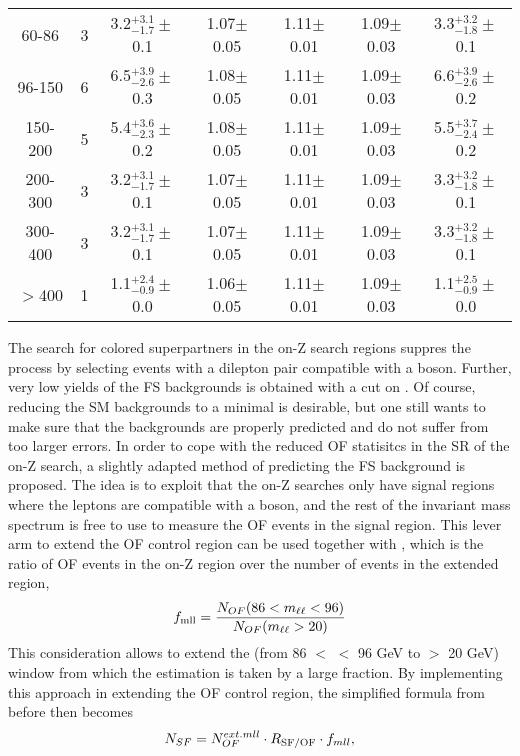 \begin{table}[ht!]
\begin{tabular}{ c  c  c  c  c  c c}
60-86    & 3    & 3.2$^{+3.1}_{-1.7}\pm$0.1  &  1.07$\pm$0.05 & 1.11$\pm$0.01& 1.09$\pm$0.03 & 3.3$^{+3.2}_{-1.8}\pm$0.1 \\
96-150   & 6    & 6.5$^{+3.9}_{-2.6}\pm$0.3  &  1.08$\pm$0.05 & 1.11$\pm$0.01& 1.09$\pm$0.03 & 6.6$^{+3.9}_{-2.6}\pm$0.2 \\
150-200  & 5    & 5.4$^{+3.6}_{-2.3}\pm$0.2  &  1.08$\pm$0.05 & 1.11$\pm$0.01& 1.09$\pm$0.03 & 5.5$^{+3.7}_{-2.4}\pm$0.2 \\
200-300  & 3    & 3.2$^{+3.1}_{-1.7}\pm$0.1  &  1.07$\pm$0.05 & 1.11$\pm$0.01& 1.09$\pm$0.03 & 3.3$^{+3.2}_{-1.8}\pm$0.1 \\
300-400  & 3    & 3.2$^{+3.1}_{-1.7}\pm$0.1  &  1.07$\pm$0.05 & 1.11$\pm$0.01& 1.09$\pm$0.03 & 3.3$^{+3.2}_{-1.8}\pm$0.1 \\
$>$400   & 1    & 1.1$^{+2.4}_{-0.9}\pm$0.0  &  1.06$\pm$0.05 & 1.11$\pm$0.01& 1.09$\pm$0.03 & 1.1$^{+2.5}_{-0.9}\pm$0.0 \\
\hline\hline
\end{tabular}
\end{table}
\newpara
\noindent\justify
The search for colored superpartners in the on-Z search regions suppres the \ttbar process by selecting events with a dilepton pair compatible with a \PZ boson.
Further, very low yields of the FS backgrounds is obtained with a cut on \mttwo.
Of course, reducing the SM backgrounds to a minimal is desirable, but one still wants to make sure that the backgrounds are properly predicted and do not suffer from too larger errors.
In order to cope with the reduced OF statisitcs in the SR of the on-Z search, a slightly adapted method of predicting the FS background is proposed.
The idea is to exploit that the on-Z searches only have signal regions where the leptons are compatible with a \PZ boson, and the rest of the invariant mass spectrum is free to use to measure the OF events in the signal region.
This lever arm to extend the OF control region can be used together with \fmll, which is the ratio of OF events in the on-Z region over the number of events in the extended \mll region,
\begin{equation}
f_{\text{mll}}=\frac{N_{OF}(86<m_{\ell\ell}<96)}{N_{OF}(m_{\ell\ell}>20)}
\end{equation}
This consideration allows to extend the \mll (from 86 $<$ \mll $<$ 96 GeV to \mll $>$ 20 GeV) window from which the estimation is taken by a large fraction.
By implementing this approach in extending the OF control region, the simplified formula from before then becomes
\begin{equation}
\label{eq:estFSEwk}
    N_{SF} = N_{OF}^{ext.mll} \cdot R_{\text{SF/OF}} \cdot f_{mll},
\end{equation}
